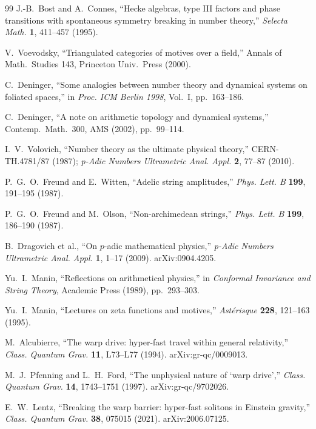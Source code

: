 \documentclass[12pt,a4paper]{article}
\theoremstyle{definition}
\begin{document}
\begin{thebibliography}{99}
J.-B.~Bost and A.~Connes, ``Hecke algebras, type III factors and phase transitions with spontaneous symmetry breaking in number theory,'' \textit{Selecta Math.} \textbf{1}, 411--457 (1995).

V.~Voevodsky, ``Triangulated categories of motives over a field,'' Annals of Math.~Studies 143, Princeton Univ.~Press (2000).

C.~Deninger, ``Some analogies between number theory and dynamical systems on foliated spaces,'' in \textit{Proc. ICM Berlin 1998}, Vol.~I, pp.~163--186.

C.~Deninger, ``A note on arithmetic topology and dynamical systems,'' Contemp.~Math.~300, AMS (2002), pp.~99--114.

I.~V.~Volovich, ``Number theory as the ultimate physical theory,'' CERN-TH.4781/87 (1987); \textit{p-Adic Numbers Ultrametric Anal. Appl.} \textbf{2}, 77--87 (2010).

P.~G.~O.~Freund and E.~Witten, ``Adelic string amplitudes,'' \textit{Phys. Lett. B} \textbf{199}, 191--195 (1987).

P.~G.~O.~Freund and M.~Olson, ``Non-archimedean strings,'' \textit{Phys. Lett. B} \textbf{199}, 186--190 (1987).

B.~Dragovich et al., ``On $p$-adic mathematical physics,'' \textit{p-Adic Numbers Ultrametric Anal. Appl.} \textbf{1}, 1--17 (2009). arXiv:0904.4205.

Yu.~I.~Manin, ``Reflections on arithmetical physics,'' in \textit{Conformal Invariance and String Theory}, Academic Press (1989), pp.~293--303.

Yu.~I.~Manin, ``Lectures on zeta functions and motives,'' \textit{Ast\'{e}risque} \textbf{228}, 121--163 (1995).

M.~Alcubierre, ``The warp drive: hyper-fast travel within general relativity,'' \textit{Class. Quantum Grav.} \textbf{11}, L73--L77 (1994). arXiv:gr-qc/0009013.

M.~J.~Pfenning and L.~H.~Ford, ``The unphysical nature of `warp drive','' \textit{Class. Quantum Grav.} \textbf{14}, 1743--1751 (1997). arXiv:gr-qc/9702026.

E.~W.~Lentz, ``Breaking the warp barrier: hyper-fast solitons in Einstein gravity,'' \textit{Class. Quantum Grav.} \textbf{38}, 075015 (2021). arXiv:2006.07125.


\end{thebibliography}
\end{document}

